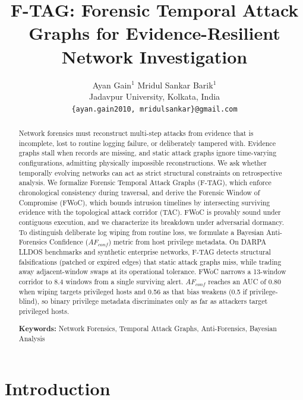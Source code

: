 \documentclass[12pt]{article}
\begin{document}
\setlength{\textfloatsep}{8pt plus 2pt minus 2pt}
\setlength{\floatsep}{8pt plus 2pt minus 2pt}
\setlength{\intextsep}{8pt plus 2pt minus 2pt}

\title{F-TAG: Forensic Temporal Attack Graphs for Evidence-Resilient Network Investigation}

\author{Ayan Gain$^{1}$ \qquad Mridul Sankar Barik$^{1}$ \\
Jadavpur University, Kolkata, India \\
\texttt{\{ayan.gain2010, mridulsankar\}@gmail.com}}

\maketitle

\begin{abstract}
Network forensics must reconstruct multi-step attacks from evidence that is incomplete, lost to routine logging failure, or deliberately tampered with. Evidence graphs stall when records are missing, and static attack graphs ignore time-varying configurations, admitting physically impossible reconstructions. We ask whether temporally evolving networks can act as strict structural constraints on retrospective analysis. We formalize Forensic Temporal Attack Graphs (F-TAG), which enforce chronological consistency during traversal, and derive the Forensic Window of Compromise (FWoC), which bounds intrusion timelines by intersecting surviving evidence with the topological attack corridor (TAC). FWoC is provably sound under contiguous execution, and we characterize its breakdown under adversarial dormancy. To distinguish deliberate log wiping from routine loss, we formulate a Bayesian Anti-Forensics Confidence ($AF_{conf}$) metric from host privilege metadata. On DARPA LLDOS benchmarks and synthetic enterprise networks, F-TAG detects structural falsifications (patched or expired edges) that static attack graphs miss, while trading away adjacent-window swaps at its operational tolerance. FWoC narrows a 13-window corridor to 8.4 windows from a single surviving alert. $AF_{conf}$ reaches an AUC of 0.80 when wiping targets privileged hosts and 0.56 as that bias weakens (0.5 if privilege-blind), so binary privilege metadata discriminates only as far as attackers target privileged hosts.

\textbf{Keywords:} Network Forensics, Temporal Attack Graphs, Anti-Forensics, Bayesian Analysis
\end{abstract}

\section{Introduction}\label{sec:introduction}
\end{document}
